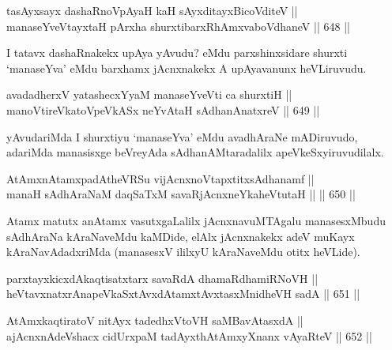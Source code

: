 
\begin{shl}
tasAyxsayx dashaRnoVpAyaH kaH sAyxditayxBicoVditeV || \\
manaseYveVtayxtaH pArxha shurxtibarxRhAmxvaboVdhaneV \hfill || 648 ||  
\end{shl}

\begin{artha}
I tatavx dashaRnakekx upAya yAvudu? eMdu parxshinxsidare shurxti `manaseYva' eMdu barxhamx jAcnxnakekx A upAyavanunx heVLiruvudu.
\end{artha}

\begin{shl}
avadadherxV yatashecxYyaM manaseYveVti ca shurxtiH || \\
manoVtireVkatoV\s peVkASx neYvAtaH sAdhanAnatxreV \hfill || 649 ||  
\end{shl}

\begin{artha}
yAvudariMda I shurxtiyu `manaseYva' eMdu avadhAraNe mADiruvudo,
adariMda manasisxge beVreyAda sAdhanAMtaradalilx apeVkeSxyiruvudilalx.
\end{artha}

\begin{shl}
AtAmxnAtamxpadAtheVRSu vijAcnxnoVtapxtitxsAdhanamf || \\
manaH sAdhAraNaM daqSaTxM savaRjAcnxneYkaheVtutaH ||  \hfill || 650 ||  
\end{shl}

\begin{artha}
Atamx matutx anAtamx vasutxgaLalilx jAcnxnavuMTAgalu manasesxMbudu
sAdhAraNa kAraNaveMdu kaMDide, elAlx jAcnxnakekx adeV muKayx
kAraNavAdadxriMda (manasesxV ililxyU kAraNaveMdu otitx heVLide).
\end{artha}


\begin{shl}
parxtayxkicxdAkaqtisatxtarx savaRdA dhamaRdhamiRNoVH || \\
heVtavxnatxrAnapeVkaSxtAvxdAtamxtAvxtasxMnidheVH sadA \hfill || 651 ||  
\end{shl}

\begin{shl}
AtAmxkaqtiratoV nitAyx tadedhxVtoVH saMBavAtasxdA || \\
ajAcnxnAdeVshacx cidUrxpaM tadAyxthAtAmxyXnanx vAyaRteV \hfill || 652 ||  
\end{shl}

